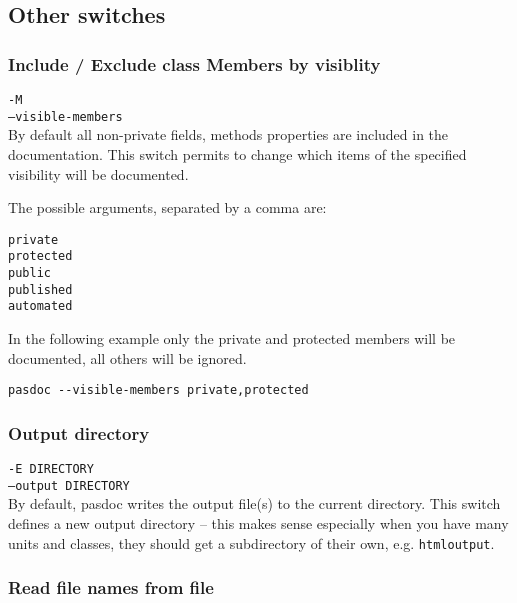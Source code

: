 \documentclass[11pt]{article}
\begin{document}
\subsection{Other switches}



\subsubsection{Include / Exclude class Members by visiblity}

{\tt -M}\\
{\tt --visible-members}\\

By default all non-private fields, methods properties are included
in the documentation. This switch permits to change which items
of the specified visibility will be documented. 

The possible arguments, separated by a comma are:
\begin{description}
\item[{\tt private}]
\item[{\tt protected}]
\item[{\tt public}]
\item[{\tt published}]
\item[{\tt automated}]
\end{description}

In the following example only the private and protected members
will be documented, all others will be ignored.

\begin{verbatim}
pasdoc --visible-members private,protected
\end{verbatim}

\subsubsection{Output directory}

{\tt -E DIRECTORY}\\
{\tt --output DIRECTORY}\\

By default, pasdoc writes the output file(s) to the current directory.
This switch defines a new output directory -- this makes sense
especially when you have many units and classes, they should get
a subdirectory of their own, e.g. {\tt htmloutput}.

\subsubsection{Read file names from file}
\end{document}
